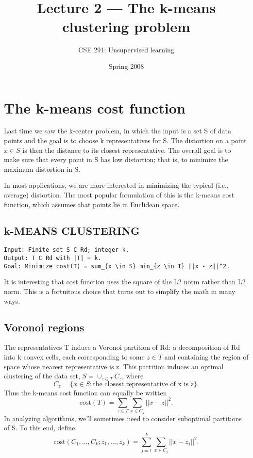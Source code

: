 \documentclass{article}
\title{Lecture 2 --- The k-means clustering problem}
\author{CSE 291: Unsupervised learning}
\date{Spring 2008}
\begin{document}
\maketitle

\section{The k-means cost function}

Last time we saw the k-center problem, in which the input is a set S of data points and the goal is to choose k representatives for S. The distortion on a point $x \in S$ is then the distance to its closest representative. The overall goal is to make sure that every point in S has low distortion; that is, to minimize the maximum distortion in S.

In most applications, we are more interested in minimizing the typical (i.e., average) distortion. The most popular formulation of this is the k-means cost function, which assumes that points lie in Euclidean space.

\subsection*{k-MEANS CLUSTERING}
\begin{verbatim}
Input: Finite set S C Rd; integer k.
Output: T C Rd with |T| = k.
Goal: Minimize cost(T) = sum_{x \in S} min_{z \in T} ||x - z||^2.
\end{verbatim}

It is interesting that cost function uses the square of the L2 norm rather than L2 norm. This is a fortuitous choice that turns out to simplify the math in many ways.

\subsection{Voronoi regions}

The representatives T induce a Voronoi partition of Rd: a decomposition of Rd into k convex cells, each corresponding to some $z \in T$ and containing the region of space whose nearest representative is z.
This partition induces an optimal clustering of the data set, $S = \cup_{z \in T} C_z$, where
\[ C_z = \{x \in S : \text{the closest representative of x is z}\}. \]
Thus the k-means cost function can equally be written
\[ \text{cost}(T) = \sum_{z \in T} \sum_{x \in C_z} ||x - z||^2. \]
In analyzing algorithms, we'll sometimes need to consider suboptimal partitions of S. To this end, define
\[ \text{cost}(C_1, \dots, C_k; z_1, \dots, z_k) = \sum_{j=1}^k \sum_{x \in C_j} ||x - z_j||^2. \]
\end{document}
